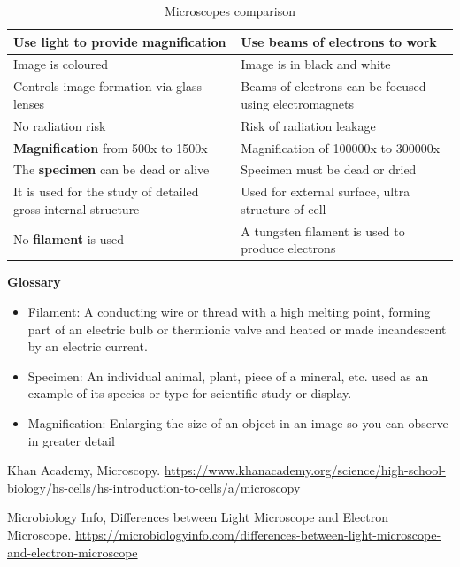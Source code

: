 \documentclass[12pt,letterpaper,final]{article}
\begin{document}
\begin{table}[]
{\begin{tabular}{@{}|l|l|@{}}
\LARGE Use light to provide magnification & \LARGE Use beams of electrons to work \\ \midrule
\LARGE Image is coloured &  \LARGE Image is in black and white \\ \midrule
\LARGE Controls image formation via glass lenses &  \LARGE Beams of electrons can be focused using electromagnets \\ \midrule
\LARGE No radiation risk &  \LARGE Risk of radiation leakage \\ \bottomrule
\LARGE \textbf{Magnification} from 500x to 1500x &  \LARGE Magnification of 100000x to 300000x \\ \bottomrule
\LARGE The \textbf{specimen} can be dead or alive &  \LARGE Specimen must be dead or dried \\ \bottomrule
\LARGE It is used for the study of detailed gross internal structure  &  \LARGE Used for external surface, ultra structure of cell \\ \bottomrule
\LARGE No \textbf{filament} is used &  \LARGE A tungsten filament is used to produce electrons \\ \bottomrule  
\end{tabular}%
}
\caption{Microscopes comparison}
\label{tab:my-table}
\end{table}

\newpage

\textbf{Glossary}
\begin{itemize}

\item Filament: A conducting wire or thread with a high melting point, forming part of an electric bulb or thermionic valve and heated or made incandescent by an electric current.    

\item Specimen: An individual animal, plant, piece of a mineral, etc. used as an example of its species or type for scientific study or display.

\item Magnification: Enlarging the size of an object in an image so you can observe in greater detail

\end{itemize}


\begin{thebibliography}{9}
 
Khan Academy, Microscopy.
\href{https://www.khanacademy.org/science/high-school-biology/hs-cells/hs-introduction-to-cells/a/microscopy}{https://www.khanacademy.org/science/high-school-biology/hs-cells/hs-introduction-to-cells/a/microscopy}
 
Microbiology Info, Differences between Light Microscope and Electron Microscope.
\href{https://microbiologyinfo.com/differences-between-light-microscope-and-electron-microscope/}{https://microbiologyinfo.com/differences-between-light-microscope-and-electron-microscope} 

\end{thebibliography}
\end{document}
